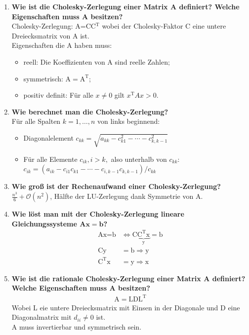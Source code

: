 \begin{enumerate}
		\pagebreak
		
		\item \textbf{Wie ist die Cholesky-Zerlegung einer Matrix A definiert? Welche Eigenschaften muss A besitzen?} \\
			Cholesky-Zerlegung: A=CC\(^\text{T}\) wobei der Cholesky-Faktor C eine untere Dreiecksmatrix von A ist. \\
			Eigenschaften die A haben muss:
			\begin{itemize}
				\item reell: Die Koeffizienten von A sind reelle Zahlen;
				\item symmetrisch: \(\text{A}=\text{A}^\text{T}\);
				\item positiv definit: Für alle \(x\neq0\) gilt \(x^\text{T}Ax>0\).
			\end{itemize}
		
		\item \textbf{Wie berechnet man die Cholesky-Zerlegung?} \\
			Für alle Spalten \(k=1,\dots,n\) von links beginnend:
			\begin{itemize}
				\item[] Diagonalelement \(c_{kk}=\sqrt{a_{kk}-c_{k1}^2-\cdots-c_{k,k-1}^2}\)
				\item[] Für alle Elemente \(c_{ik},i>k,\) also unterhalb von \(c_{kk}\):\\
				\mbox{}\hspace{0.5cm}\(c_{ik}=(a_{ik}-c_{i1}c_{k1}-\cdots-c_{i,k-1}c_{k,k-1})/c_{kk}\)
			\end{itemize}
		
		\item \textbf{Wie groß ist der Rechenaufwand einer Cholesky-Zerlegung?} \\
			\(\frac{n^3}{6}+\mathcal{O}(n^2)\), Hälfte der LU-Zerlegung dank Symmetrie von A.
		
		\item \textbf{Wie löst man mit der Cholesky-Zerlegung lineare Gleichungssysteme \(\mathbf{Ax=b}\)?}
			\begin{align*}
				\text{Ax}=\text{b}&\Longleftrightarrow \text{C}\underbrace{\text{C}^\text{T}\text{x}}_\text{y}=\text{b} \\
				\text{Cy}&=\text{b} \Rightarrow \text{y} \\
				\text{C}^\text{T}\text{x}&=\text{y} \Rightarrow \text{x}
			\end{align*}
		
		\item \textbf{Wie ist die rationale Cholesky-Zerlegung einer Matrix A definiert? Welche Eigenschaften muss A besitzen?}
			\begin{align*}
				\text{A}=\text{LDL}^\text{T}
			\end{align*}
			Wobei L eie untere Dreiecksmatrix mit Einsen in der Diagonale und D eine Diagonalmatrix mit \(d_{ii}\neq0\) ist.\\
			A muss invertierbar und symmetrisch sein.
		

\end{enumerate}
